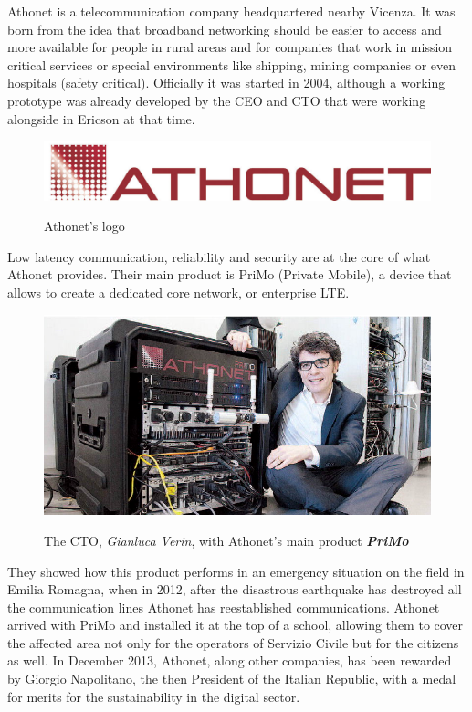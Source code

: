 	Athonet is a telecommunication company headquartered nearby Vicenza.
	It was born from the idea that broadband networking should be easier to access and more available for people in rural areas and for companies that work in mission critical services or special environments like shipping, mining companies or even hospitals (safety critical).
	Officially it was started in 2004, although a working prototype was already developed by the CEO and CTO that were working alongside in Ericson at that time.
	\begin{figure}[H]
		\centering
		\includegraphics[width=.7\textwidth]{resources/ath_logo}\\
		\caption{Athonet's logo}
	\end{figure}
	Low latency communication, reliability and security are at the core of what Athonet provides.
	Their main product is PriMo (Private Mobile), a device that allows to create a dedicated core network, or enterprise LTE.
	\begin{figure}[H]
		\centering
		\includegraphics[width=.7\textwidth]{resources/gianluca_primo}\\
		\caption{The CTO, \textit{Gianluca Verin}, with Athonet's main product \textbf{\textit{PriMo}}}
	\end{figure}
	They showed how this product performs in an emergency situation on the field in Emilia Romagna, when in 2012, after the disastrous earthquake has destroyed all the communication lines Athonet has reestablished communications.
	Athonet arrived with PriMo and installed it at the top of a school, allowing them to cover the affected area not only for the operators of Servizio Civile but for the citizens as well.
	In December 2013, Athonet, along other companies, has been rewarded by Giorgio Napolitano, the then President of the Italian Republic, with a medal for merits for the sustainability in the digital sector.
